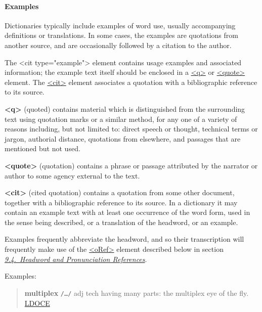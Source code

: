 \paragraph[{Examples}]{Examples}\label{DITPEG}\par
Dictionaries typically include examples of word use, usually accompanying definitions or translations. In some cases, the examples are quotations from another source, and are occasionally followed by a citation to the author. \par
The <cit type="example"> element contains usage examples and associated information; the example text itself should be enclosed in a \hyperref[TEI.q]{<q>} or \hyperref[TEI.quote]{<quote>} element. The \hyperref[TEI.cit]{<cit>} element associates a quotation with a bibliographic reference to its source.
\begin{sansreflist}
  
\item [\textbf{<q>}] (quoted) contains material which is distinguished from the surrounding text using quotation marks or a similar method, for any one of a variety of reasons including, but not limited to: direct speech or thought, technical terms or jargon, authorial distance, quotations from elsewhere, and passages that are mentioned but not used.
\item [\textbf{<quote>}] (quotation) contains a phrase or passage attributed by the narrator or author to some agency external to the text.
\item [\textbf{<cit>}] (cited quotation) contains a quotation from some other document, together with a bibliographic reference to its source. In a dictionary it may contain an example text with at least one occurrence of the word form, used in the sense being described, or a translation of the headword, or an example.
\end{sansreflist}
\par
Examples frequently abbreviate the headword, and so their transcription will frequently make use of the \hyperref[TEI.oRef]{<oRef>} element described below in section \textit{\hyperref[DIHW]{9.4.\ Headword and Pronunciation References}}.\par
Examples:
\begin{quote}{\bfseries multiplex} \texttt{/…/} adj tech having many parts: the multiplex eye of the fly. \hyperref[DIC-LDOCE]{LDOCE}\end{quote}
